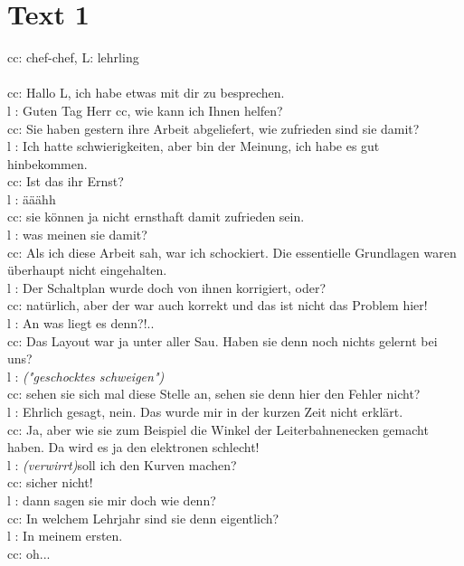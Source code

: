 \section{Text 1}
cc: chef-chef, L: lehrling\\
\\
cc: Hallo L, ich habe etwas mit dir zu besprechen. \\
l : Guten Tag Herr cc, wie kann ich Ihnen helfen?\\
cc: Sie haben gestern ihre Arbeit abgeliefert, wie zufrieden sind sie damit?\\
l : Ich hatte schwierigkeiten, aber bin der Meinung, ich habe es gut hinbekommen.\\
cc: Ist das ihr Ernst?\\
l : ääähh\\
cc: sie können ja nicht ernsthaft damit zufrieden sein.\\
l : was meinen sie damit? \\
cc: Als ich diese Arbeit sah, war ich schockiert. Die essentielle Grundlagen waren überhaupt nicht eingehalten. \\
l : Der Schaltplan wurde doch von ihnen korrigiert, oder?\\
cc: natürlich, aber der war auch korrekt und das ist nicht das Problem hier!\\
l : An was liegt es denn?!..\\
cc: Das Layout war ja unter aller Sau. Haben sie denn noch nichts gelernt bei uns?\\
l : \emph{("geschocktes schweigen")}\\
cc: sehen sie sich mal diese Stelle an, sehen sie denn hier den Fehler nicht?\\
l : Ehrlich gesagt, nein. Das wurde mir in der kurzen Zeit nicht erklärt.\\
cc: Ja, aber wie sie zum Beispiel die Winkel der Leiterbahnenecken gemacht haben. Da wird es ja den elektronen schlecht!\\
l : \emph{(verwirrt)}soll ich den Kurven machen?\\
cc: sicher nicht!\\
l : dann sagen sie mir doch wie denn?\\
cc: In welchem Lehrjahr sind sie denn eigentlich?\\
l : In meinem ersten.\\
cc: oh...